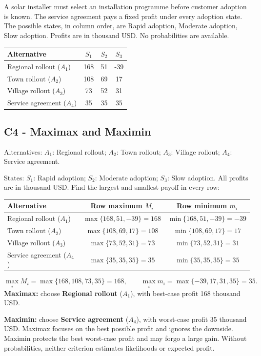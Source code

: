 \clearpage
{}
A solar installer must select an installation programme before customer adoption is known. The service agreement pays a fixed profit under every adoption state. The possible states, in column order, are Rapid adoption, Moderate adoption, Slow adoption. Profits are in thousand USD. No probabilities are available.
\begin{center}
\begin{tabular}{@{}lccc@{}}\toprule
Alternative & $S_1$ & $S_2$ & $S_3$\\\midrule
Regional rollout ($A_1$) & 168 & 51 & -39\\
Town rollout ($A_2$) & 108 & 69 & 17\\
Village rollout ($A_3$) & 73 & 52 & 31\\
Service agreement ($A_4$) & 35 & 35 & 35\\
\bottomrule\end{tabular}
\end{center}
\subsection*{C4 - Maximax and Maximin }
\label{sol:solar-installation-c4}
Alternatives: $A_1$: Regional rollout; $A_2$: Town rollout; $A_3$: Village rollout; $A_4$: Service agreement.\par
States: $S_1$: Rapid adoption; $S_2$: Moderate adoption; $S_3$: Slow adoption.
All profits are in thousand USD. Find the largest and smallest payoff in every row:
\begin{center}
\begin{tabular}{@{}lcc@{}}\toprule
Alternative & Row maximum $M_i$ & Row minimum $m_i$\\\midrule
Regional rollout ($A_1$) & $\max\{168,51,-39\}=168$ & $\min\{168,51,-39\}=-39$\\
Town rollout ($A_2$) & $\max\{108,69,17\}=108$ & $\min\{108,69,17\}=17$\\
Village rollout ($A_3$) & $\max\{73,52,31\}=73$ & $\min\{73,52,31\}=31$\\
Service agreement ($A_4$) & $\max\{35,35,35\}=35$ & $\min\{35,35,35\}=35$\\
\bottomrule\end{tabular}
\end{center}
\[\max_i M_i=\max\{168,108,73,35\}=168,\qquad \max_i m_i=\max\{-39,17,31,35\}=35.\]
\textbf{Maximax:} choose \textbf{Regional rollout} ($A_1$), with best-case profit 168 thousand USD.\par
\textbf{Maximin:} choose \textbf{Service agreement} ($A_4$), with worst-case profit 35 thousand USD.
Maximax focuses on the best possible profit and ignores the downside. Maximin protects the best worst-case profit and may forgo a large gain. Without probabilities, neither criterion estimates likelihoods or expected profit.
\par\vspace{4mm}

